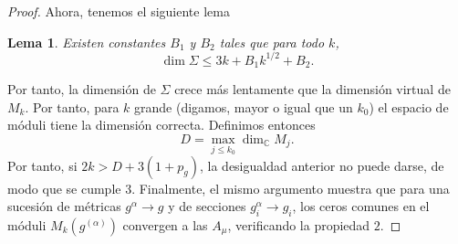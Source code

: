 \documentclass[12pt, a4paper]{amsart}
\newcommand\CC{\mathbb{C}}
\newtheorem{lema}[thm]{Lema}
\theoremstyle{remark} \newtheorem{rmk}[thm]{Observación}
\theoremstyle{remark} \newtheorem{rmks}[thm]{Observaciones}
\theoremstyle{definition} \newtheorem{defn}[thm]{Definición}
\theoremstyle{definition} \newtheorem{ejs}[thm]{Ejemplos}
\theoremstyle{definition} \newtheorem{ej}[thm]{Ejemplo}
\begin{document}
\begin{proof}
	Ahora, tenemos el siguiente lema
	\begin{lema}
	Existen constantes $B_1$ y $B_2$ tales que para todo $k$,
	\begin{equation*}
	\dim \Sigma \leq 3k + B_1 k^{1/2} + B_2.
	\end{equation*} 
	\end{lema}
	Por tanto, la dimensión de $\Sigma$ crece más lentamente que la dimensión virtual de $M_k$. Por tanto, para $k$ grande (digamos, mayor o igual que un $k_0$) el espacio de móduli tiene la dimensión correcta. Definimos entonces 
	\begin{equation*}
	D=\max_{j \leq k_0} \dim_{\CC} M_j.
	\end{equation*} 
	Por tanto, si $2k> D+3(1+p_g)$, la desigualdad anterior no puede darse, de modo que se cumple 3. Finalmente, el mismo argumento muestra que para una sucesión de métricas $g^{\alpha}\rightarrow g$ y de secciones $g_i^{\alpha}\rightarrow g_i$, los ceros comunes en el móduli $M_k(g^{(\alpha)})$ convergen a las $A_\mu$, verificando la propiedad $2$.
\end{proof}

\nocite{*}


\end{document}
